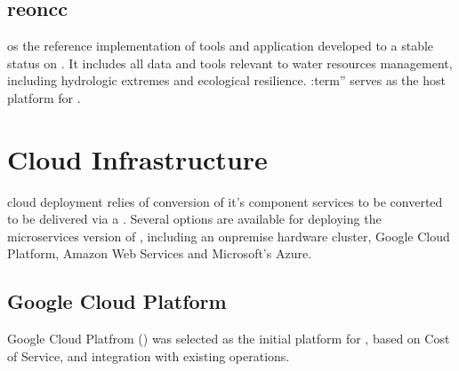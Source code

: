 \documentclass[letterpaper,12pt,english,openany,oneside]{sphinxmanual}
\begin{document}
\sphinxstepscope


\section{reoncc}
\label{\detokenize{euidev/development/_autosummary/reoncc:module-reoncc}}\label{\detokenize{euidev/development/_autosummary/reoncc:reoncc}}\label{\detokenize{euidev/development/_autosummary/reoncc::doc}}
\sphinxAtStartPar
{} os the reference implementation of tools and application developed to a stable status on . It includes all data and tools relevant to water resources management, including hydrologic extremes and ecological resilience. :term” serves as the host platform for .

\sphinxstepscope


\chapter{Cloud Infrastructure}
\label{\detokenize{euidev/infrastructure/index:cloud-infrastructure}}\label{\detokenize{euidev/infrastructure/index::doc}}
\sphinxAtStartPar
{} cloud deployment relies of conversion of it’s component services to be converted to be delivered via a . Several options are available for deploying the microservices version of , including an on\sphinxhyphen{}premise hardware cluster, Google Cloud Platform, Amazon Web Services and Microsoft’s Azure.


\section{Google Cloud Platform}
\label{\detokenize{euidev/infrastructure/index:google-cloud-platform}}
\sphinxAtStartPar
Google Cloud Platfrom () was selected as the initial platform for , based on Cost of Service, and integration with existing  operations.
\end{document}
